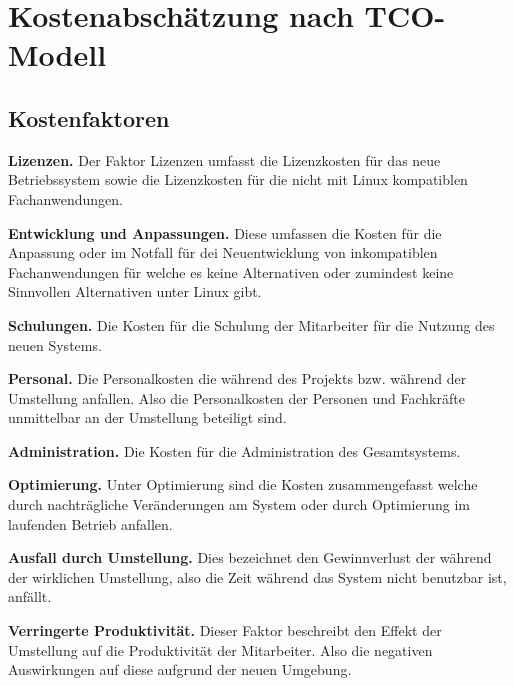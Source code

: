 \documentclass[12pt,utf8]{scrartcl}
\begin{document}
\newpage
\section*{Kostenabschätzung nach TCO-Modell}

\subsection*{Kostenfaktoren}

\textbf{Lizenzen.} Der Faktor Lizenzen umfasst die Lizenzkosten für das neue Betriebssystem sowie die Lizenzkosten für die nicht mit Linux kompatiblen Fachanwendungen.
\newline

\textbf{Entwicklung und Anpassungen.} Diese umfassen die Kosten für die Anpassung oder im Notfall für dei Neuentwicklung von inkompatiblen Fachanwendungen für welche es keine Alternativen oder zumindest keine Sinnvollen Alternativen unter Linux gibt.
\newline

\textbf{Schulungen.} Die Kosten für die Schulung der Mitarbeiter für die Nutzung des neuen Systems.
\newline

\textbf{Personal.} Die Personalkosten die während des Projekts bzw. während der Umstellung anfallen. Also die Personalkosten der Personen und Fachkräfte unmittelbar an der Umstellung beteiligt sind.
\newline

\textbf{Administration.} Die Kosten für die Administration des Gesamtsystems.
\newline

\textbf{Optimierung.} Unter Optimierung sind die Kosten zusammengefasst welche durch nachträgliche Veränderungen am System oder durch Optimierung im laufenden Betrieb anfallen.
\newline

\textbf{Ausfall durch Umstellung.} Dies bezeichnet den Gewinnverlust der während der wirklichen Umstellung, also die Zeit während das System nicht benutzbar ist, anfällt.
\newline

\textbf{Verringerte Produktivität.} Dieser Faktor beschreibt den Effekt der Umstellung auf die Produktivität der Mitarbeiter. Also die negativen Auswirkungen auf diese aufgrund der neuen Umgebung.
\newpage
\end{document}

